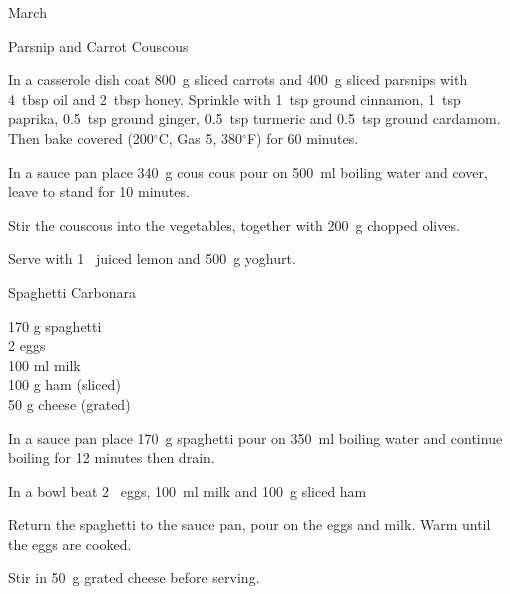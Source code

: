 \begin{menu}{March}
\begin{recipe}{2}{Parsnip and Carrot Couscous}
    \begin{instructions}
    \item 
        In a casserole dish coat
        800~g sliced carrots
        and
        400~g sliced parsnips
        with
        4~tbsp  oil
        and
        2~tbsp  honey.
        Sprinkle with
        1~tsp  ground cinnamon,
        1~tsp  paprika,
        0.5~tsp  ground ginger,
        0.5~tsp  turmeric
        and
        0.5~tsp  ground cardamom.
        Then bake covered
        (200$^{\circ}$C, Gas 5, 380$^{\circ}$F)
        for 60 minutes.
      \item 
    In a
    sauce pan
    place
    340~g  cous cous
    pour on
    500~ml  boiling water
    and cover, leave to stand for 10 minutes.
  \item 
        Stir the couscous into the vegetables,
        together with
        200~g chopped olives.
      \item 
        Serve with 1~ juiced lemon
        and
        500~g  yoghurt.
      
    \end{instructions}
    \end{recipe}%
  
    \begin{recipe}{1}{Spaghetti Carbonara}%
		\begin{ingredients}
		170 g spaghetti  \\
	2  eggs  \\
	100 ml milk  \\
	100 g ham (sliced) \\
	50 g cheese (grated) \\
	
		\end{ingredients}
	
	
	
    \begin{instructions}
    \item 
    In a
    sauce pan
    place
    170~g  spaghetti
    pour on
    350~ml  boiling water
    and continue boiling for 12 minutes then drain.
  \item 
        In a bowl beat
        2~  eggs,
        100~ml  milk
        and
        100~g sliced ham\item 
        Return the spaghetti to the sauce pan,
        pour on the eggs and milk.
        Warm until the eggs are cooked.
      \item 
        Stir in
        50~g grated cheese
        before serving.
      
    \end{instructions}
    \end{recipe}%
  
    \clearpage
    \end{menu}
	
